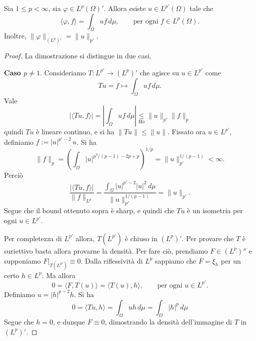 \begin{theorem}
\label{th:riesz_repr}
	Sia $1 \leq p < \infty$, sia $\varphi \in L^p(\Omega)'$.
	Allora esiste $u \in L^{p'}(\Omega)$ tale che
	\begin{equation*}
		\langle \varphi, f \rangle = \int_\Omega uf\,d\mu, \qquad \text{per ogni $f \in L^p(\Omega)$}.
	\end{equation*}
	Inoltre, $\|\varphi\|_{(L^p)'} = \|u\|_{p'}$.
\end{theorem}
\begin{proof}
	La dimostrazione si distingue in due casi.

	\textbf{Caso $p \neq 1$}. Consideriamo $T:L^{p'} \to (L^p)'$ che agisce su $u \in L^{p'}$ come
	\begin{equation*}
		Tu = f \mapsto \int_\Omega uf \,d\mu.
	\end{equation*}
	Vale
	\begin{equation*}
		|\langle Tu, f \rangle| = \left| \int_\Omega uf\,d\mu \right| \underset{\text{H\"o}}\leq \|u\|_{p'} \|f\|_p
	\end{equation*}
	quindi $Tu$ è lineare continuo, e si ha $\|Tu\| \leq \|u\|$. Fissato ora $u \in L^{p'}$, definiamo $f := |u|^{p'-2} \, u$. Si ha
	\begin{equation*}
		\|f\|_p = \left( \int_\Omega |u|^{p^2/(p-1) - 2p + p} \right)^{1/p} = \|u\|_{p'}^{1/(p-1)} < \infty.
	\end{equation*}
	Perciò
	\begin{equation*}
		\frac{|\langle Tu, f\rangle|}{\|f\|_{L^p}} = \frac{\int_\Omega |u|^{p'-2}|u|^2\,d\mu}{\|u\|_{p'}^{1/(p-1)}} = \|u\|_{p'}.
	\end{equation*}
	Segue che il bound ottenuto sopra è sharp, e quindi che $Tu$ è un isometria per ogni $u \in L^{p'}$.

	Per completezza di $L^{p'}$ allora, $T(L^{p'})$ è chiuso in $(L^p)'$. Per provare che $T$ è suriettivo basta allora provarne la densità. Per fare ciò, prendiamo $F \in (L^p)''$ e supponiamo $F\vert_{T(L^{p'})} \equiv 0$. Dalla riflessività di $L^p$ sappiamo che $F= \xi_h$ per un certo $h \in L^p$. Ma allora
	\begin{equation*}
		0 = \langle F, T(u) \rangle = \langle T(u), h \rangle, \qquad \text{per ogni $u \in L^{p'}$}.
	\end{equation*}
	Definiamo $u = |h|^{p-2} h$. Si ha
	\begin{equation*}
		0 = \langle Tu, h \rangle = \int_\Omega uh\,d\mu = \int_\Omega |h|^p\,d\mu
	\end{equation*}
	Segue che $h=0$, e dunque $F \equiv 0$, dimostrando la densità dell'immagine di $T$ in $(L^p)'$.


\end{proof}
